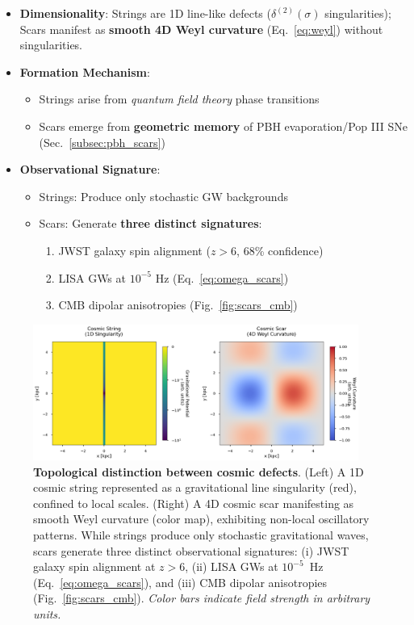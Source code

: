 \documentclass{article}
\begin{document}
\begin{itemize}
    \item \textbf{Dimensionality}: Strings are 1D line-like defects ($\delta^{(2)}(\sigma)$ singularities); Scars manifest as \textbf{smooth 4D Weyl curvature} (Eq.~\ref{eq:weyl}) without singularities.
    
    \item \textbf{Formation Mechanism}: 
    \begin{itemize}
        \item Strings arise from \textit{quantum field theory} phase transitions
        \item Scars emerge from \textbf{geometric memory} of PBH evaporation/Pop III SNe (Sec.~\ref{subsec:pbh_scars})
    \end{itemize}

\item \textbf{Observational Signature}: 
\begin{itemize}
    \item Strings: Produce only stochastic GW backgrounds
    \item Scars: Generate \textbf{three distinct signatures}:
    \begin{enumerate}
        \item JWST galaxy spin alignment ($z>6$, 68\% confidence)
        \item LISA GWs at $10^{-5}$ Hz (Eq.~\ref{eq:omega_scars})
        \item CMB dipolar anisotropies (Fig.~\ref{fig:scars_cmb})
    \end{enumerate}
\end{itemize}
\end{itemize}

\begin{figure}[H]
  \centering
  \includegraphics[width=0.95\textwidth]{figures/scars_vs_strings.png}
  \caption{
    \textbf{Topological distinction between cosmic defects}. 
    (Left) A 1D cosmic string represented as a gravitational line singularity (red), confined to local scales. 
    (Right) A 4D cosmic scar manifesting as smooth Weyl curvature (color map), exhibiting non-local oscillatory patterns. 
    While strings produce only stochastic gravitational waves, scars generate three distinct observational signatures: 
    (i) JWST galaxy spin alignment at $z>6$, (ii) LISA GWs at $10^{-5}$~Hz (Eq.~\ref{eq:omega_scars}), 
    and (iii) CMB dipolar anisotropies (Fig.~\ref{fig:scars_cmb}). 
    \textit{Color bars indicate field strength in arbitrary units.}
  }
  \label{fig:strings_vs_scars}
\end{figure}
\end{document}
